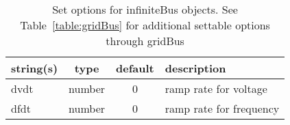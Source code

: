 \begin{table}[ht]
\centering
\begin{tabular}{p{5cm} c c p{7cm}}
\hline
string(s) & type & default & description \\
\hline
dvdt & number & 0 & ramp rate for voltage\\
dfdt & number & 0 & ramp rate for frequency\\
\hline
\end{tabular}
\caption{Set options for infiniteBus objects. See Table~\ref{table:gridBus} for additional settable options through gridBus}
\label{table:infiniteBus}
\end{table}
